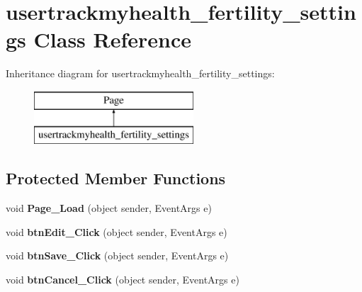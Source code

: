 \hypertarget{classusertrackmyhealth__fertility__settings}{\section{usertrackmyhealth\-\_\-fertility\-\_\-settings Class Reference}
\label{classusertrackmyhealth__fertility__settings}
}
Inheritance diagram for usertrackmyhealth\-\_\-fertility\-\_\-settings\-:\begin{figure}[H]
\begin{center}
\leavevmode
\includegraphics[height=2.000000cm]{classusertrackmyhealth__fertility__settings}
\end{center}
\end{figure}
\subsection*{Protected Member Functions}
\begin{DoxyCompactItemize}
\item 
\hypertarget{classusertrackmyhealth__fertility__settings_a95cad2ef1fe7282f3d9be772e4ad97ff}{void {\bfseries Page\-\_\-\-Load} (object sender, Event\-Args e)}\label{classusertrackmyhealth__fertility__settings_a95cad2ef1fe7282f3d9be772e4ad97ff}

\item 
\hypertarget{classusertrackmyhealth__fertility__settings_aedc0b1defb4315defefe2cffa90ef918}{void {\bfseries btn\-Edit\-\_\-\-Click} (object sender, Event\-Args e)}\label{classusertrackmyhealth__fertility__settings_aedc0b1defb4315defefe2cffa90ef918}

\item 
\hypertarget{classusertrackmyhealth__fertility__settings_acff705a02e1001ee038d679e0dd40048}{void {\bfseries btn\-Save\-\_\-\-Click} (object sender, Event\-Args e)}\label{classusertrackmyhealth__fertility__settings_acff705a02e1001ee038d679e0dd40048}

\item 
\hypertarget{classusertrackmyhealth__fertility__settings_a235e14d036ecad45213a842b5c718df1}{void {\bfseries btn\-Cancel\-\_\-\-Click} (object sender, Event\-Args e)}\label{classusertrackmyhealth__fertility__settings_a235e14d036ecad45213a842b5c718df1}

\end{DoxyCompactItemize}


